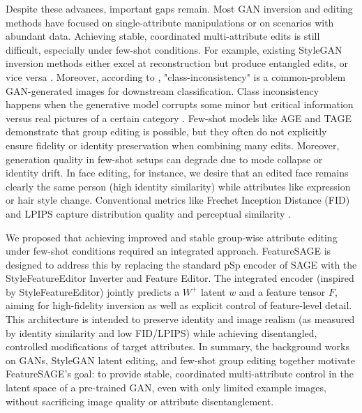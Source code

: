 Despite these advances, important gaps remain. Most GAN inversion and editing methods have focused on single-attribute manipulations or on scenarios with abundant data. Achieving stable, coordinated multi-attribute edits is still difficult, especially under few-shot conditions. For example, existing StyleGAN inversion methods either excel at reconstruction but produce entangled edits, or vice versa \cite{liu2023delvingstyleganinversionimage,richardson2021encodingstylestyleganencoder}. Moreover, according to \cite{ding2023stableattributegroupediting} , "class-inconsistency" is a common-problem GAN-generated images for downstream classification. Class inconsistency happens when the generative model corrupts some minor but critical information versus real pictures of a certain category \cite{ding2023stableattributegroupediting}. Few-shot models like AGE and TAGE demonstrate that group editing is possible, but they often do not explicitly ensure fidelity or identity preservation when combining many edits. Moreover, generation quality in few-shot setups can degrade due to mode collapse or identity drift. In face editing, for instance, we desire that an edited face remains clearly the same person (high identity similarity) while attributes like expression or hair style change. Conventional metrics like Frechet Inception Distance (FID) and LPIPS capture distribution quality and perceptual similarity \cite{karras2020analyzingimprovingimagequality,zhang2018unreasonableeffectivenessdeepfeatures}.

We proposed that achieving improved and stable group-wise attribute editing under few-shot conditions required an integrated approach.
FeatureSAGE is designed to address this by replacing the standard pSp encoder of SAGE with the StyleFeatureEditor Inverter and Feature Editor.
The integrated encoder (inspired by StyleFeatureEditor) jointly predicts a $W^+$ latent $w$ and a feature tensor $F$, aiming for high-fidelity inversion as well as explicit control of feature-level detail.
This architecture is intended to preserve identity and image realism (as measured by identity similarity and low FID/LPIPS) while achieving disentangled, controlled modifications of target attributes.
In summary, the background works on GANs, StyleGAN latent editing, and few-shot group editing together motivate FeatureSAGE's goal: to provide stable, coordinated multi-attribute control in the latent space of a pre-trained GAN, 
even with only limited example images, without sacrificing image quality or attribute disentanglement.
